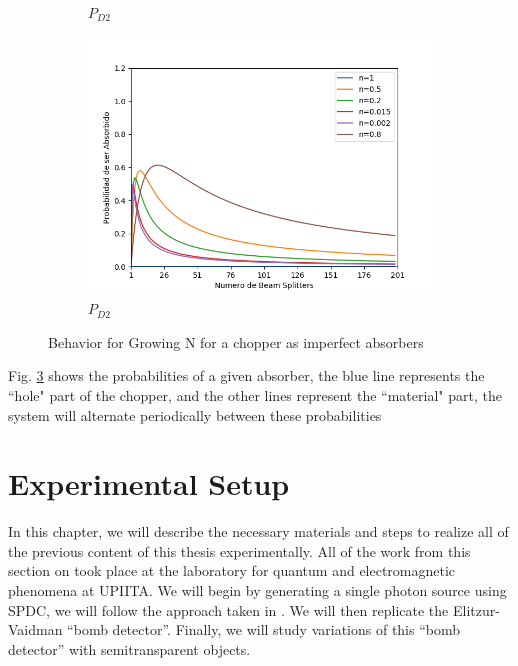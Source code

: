 \documentclass[12pt]{article}
\begin{document}
\begin{figure}[!htb]
\begin{subfigure}[b]{0.45\linewidth}
\caption{$P_{D2}$}
\label{fig:westminster_aerea}
\end{subfigure}
\begin{subfigure}[b]{0.45\linewidth}
\includegraphics[width=\linewidth]{images/Chopper_abs.png}
\caption{$P_{D2}$}
\label{fig:BS1}
\end{subfigure}
\caption{Behavior for Growing N for a chopper as imperfect absorbers}
\label{n chopper}
\end{figure}
 
\vspace{5 cm}

Fig. \ref{n chopper} shows the probabilities of a given absorber, the blue line represents the ``hole" part of the chopper, and the other lines represent the ``material" part, the system will alternate periodically between these probabilities

\pagebreak

\section{Experimental Setup}
In this chapter, we will describe the necessary materials and steps to realize all of the previous content of this thesis experimentally. All of the work from this section on took place at the laboratory for quantum and electromagnetic phenomena at UPIITA. We will begin by generating a single photon source using SPDC, we will follow the approach taken in \cite{maestria_procopio}. We will then replicate the Elitzur-Vaidman ``bomb detector''. Finally, we will study variations of this ``bomb detector'' with semitransparent objects.
\end{document}
